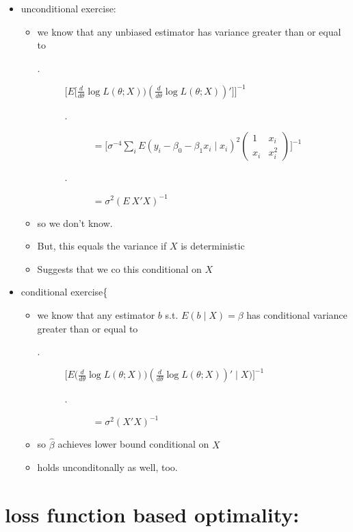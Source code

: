 \begin{itemize}
\begin{itemize}
\begin{itemize}
\item unconditional exercise:
\begin{itemize}
\item we know that any unbiased estimator has variance greater than or equal to
\begin{description}
\item[.] $\Big[E \Big[\tfrac{d}{d\theta} \log L(\theta; X)) (\tfrac{d}{d\theta} \log L(\theta; X))'\Big]\Big]^{-1}$
\begin{description}
\item[.] $=\Big[\sigma^{-4} \sum_i E (y_i - \beta_0 - \beta_1 x_i \mid x_i)^2 \begin{pmatrix} 1 & x_i \\ x_i & x_i^2 \end{pmatrix}\Big]^{-1}$
\item[.] $= \sigma^2 (E\ X'X)^{-1}$
\end{description}
\end{description}
\item so we don't know.
\item But, this equals the variance if $X$ is deterministic
\item Suggests that we co this conditional on $X$
\end{itemize}
\item conditional exercise\{
\begin{itemize}
\item we know that any estimator $b$ s.t. $E(b \mid X) = \beta$ has conditional variance greater than or equal to
\begin{description}
\item[.] $\Big[E\Big(\tfrac{d}{d\theta} \log L(\theta; X)) (\tfrac{d}{d\theta} \log L(\theta; X))' \mid X\Big)\Big]^{-1}$
\begin{description}
\item[.] $= \sigma^2 (X'X)^{-1}$
\end{description}
\end{description}
\item so $\hat\beta$ achieves lower bound conditional on $X$
\item holds unconditonally as well, too.
\end{itemize}
\end{itemize}
\end{itemize}
\end{itemize}

\section{loss function based optimality:}

